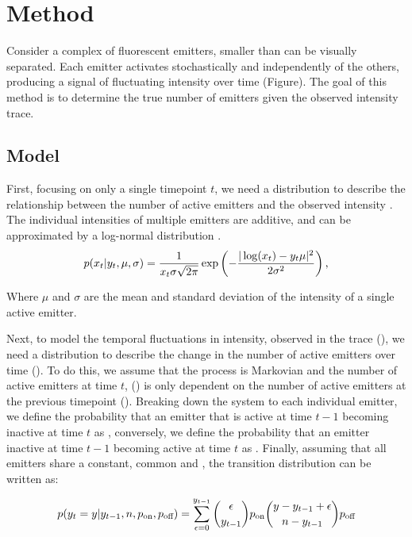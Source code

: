 \section{Method}

Consider a complex of fluorescent emitters, smaller than can be visually separated. Each emitter activates stochastically and independently of the others, producing a signal of fluctuating intensity over time (Figure).
The goal of this method is to determine the true number of emitters \truen given the observed intensity trace.

\subsection{Model}

First, focusing on only a single timepoint $t$, we need a distribution to describe the relationship between the number of active emitters  and the observed intensity . The individual intensities of multiple emitters are additive, and can be approximated by a log-normal distribution \cite{mutch_deconvolving_2007} \ie.
%
\begin{equation}
  p(x_{t}|y_{t}, \mu, \sigma) =
    \frac{1}{x_{t}\sigma\sqrt{2\pi}}
    \exp \left(
      - \frac{|\log(x_{t}) - y_{t}\mu|^2}{2\sigma^2}
    \right)
  \text{,}
\end{equation}

Where $\mu$ and $\sigma$ are the mean and standard deviation of the intensity of a single active emitter.

Next, to model the temporal fluctuations in intensity, observed in the trace (\trace), we need a distribution to describe the change in the number of active emitters over time (\states). To do this, we assume that the process is Markovian and the number of active emitters at time $t$, () is only dependent on the number of active emitters at the previous timepoint (). Breaking down the system to each individual emitter, we define the probability that an emitter that is active at time $t-1$ becoming inactive at time $t$ as \poff, conversely, we define the probability that an emitter inactive at time $t-1$ becoming active at time $t$ as \pon. Finally, assuming that all emitters share a constant, common \poff and \pon, the transition distribution can be written as:

\begin{equation}
	p(\y{t} = y | \y{t-1}, \n, \pon, \poff) = 
	\sum_{\epsilon = 0}^{\y{t-1}}
	{\epsilon \choose \y{t-1}} \pon
	{y - \y{t-1} + \epsilon \choose \n - \y{t-1}} \poff
\end{equation}

